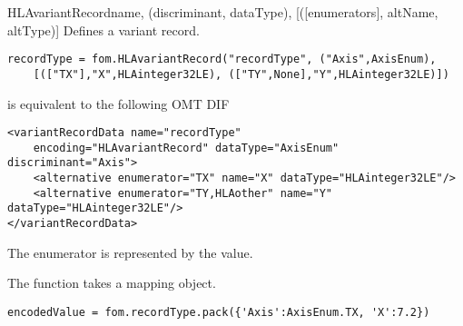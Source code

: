 \begin{classdesc}{HLAvariantRecord}{name, (discriminant, dataType), [([enumerators], altName, altType)]}
Defines a variant record.

\begin{verbatim}
recordType = fom.HLAvariantRecord("recordType", ("Axis",AxisEnum),
    [(["TX"],"X",HLAinteger32LE), (["TY",None],"Y",HLAinteger32LE)])
\end{verbatim}
is equivalent to the following OMT DIF
\begin{verbatim}
<variantRecordData name="recordType"
    encoding="HLAvariantRecord" dataType="AxisEnum" discriminant="Axis">
    <alternative enumerator="TX" name="X" dataType="HLAinteger32LE"/>
    <alternative enumerator="TY,HLAother" name="Y" dataType="HLAinteger32LE"/>
</variantRecordData>
\end{verbatim}

The  enumerator is represented by the  value.

The  function takes a mapping object.
\begin{verbatim}
encodedValue = fom.recordType.pack({'Axis':AxisEnum.TX, 'X':7.2})
\end{verbatim}
\end{classdesc}

